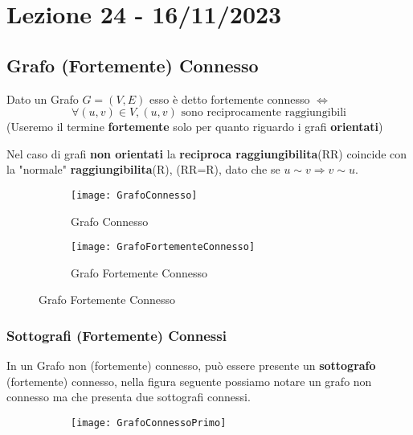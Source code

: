 \section{Lezione 24 - 16/11/2023} 
\subsection{Grafo (Fortemente) Connesso}
Dato un Grafo $G = (V,E)$ esso è detto fortemente connesso $\iff$ 
$$ \forall (u,v) \in V, (u,v) \text{ sono reciprocamente raggiungibili}$$
(Useremo il termine \textbf{fortemente} solo per quanto riguardo i grafi \textbf{orientati})


Nel caso di grafi \textbf{non orientati} la \textbf{reciproca raggiungibilita}(RR) coincide con la "normale" \textbf{raggiungibilita}(R), (RR=R), dato che se $u \sim v \Rightarrow v \sim u $.

\begin{figure}[H]
    \centering
    \begin{subfigure}[b]{0.35\textwidth}
        \texttt{[image: GrafoConnesso]} 
        \caption{Grafo Connesso}
    \end{subfigure}
    \hfill
    \begin{subfigure}[b]{0.35\textwidth}
        \texttt{[image: GrafoFortementeConnesso]} 
        \caption{Grafo Fortemente Connesso}
    \end{subfigure}
\end{figure}

\subsubsection{Sottografi (Fortemente) Connessi}
In un Grafo non (fortemente) connesso, può essere presente un \textbf{sottografo} (fortemente) connesso, nella figura seguente possiamo notare un grafo non connesso ma che presenta due sottografi connessi.
\begin{figure}[H]
    \centering
    \begin{subfigure}[b]{0.20\textwidth}
        \texttt{[image: GrafoConnessoPrimo]} 
    \end{subfigure}
\end{figure}

